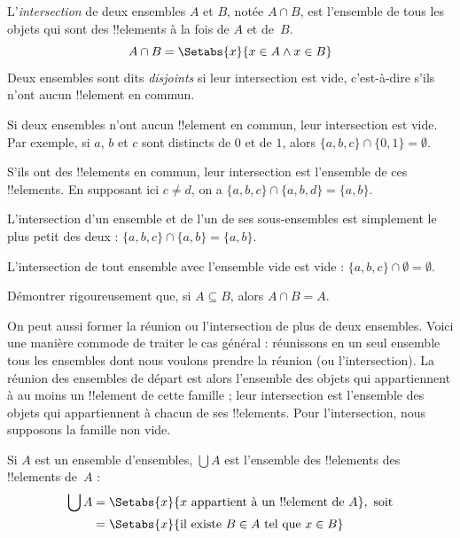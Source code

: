 \documentclass[../../../include/open-logic-section]{subfiles}
\begin{document}
\begin{defn}[Intersection]
L'\emph{intersection} de deux ensembles $A$ et $B$, notée
$A \cap B$, est l'ensemble de tous les objets qui sont
des !!{element}s à la fois de $A$ et de~$B$.
\[
A \cap B = \Setabs{x}{x \in A \land x \in B}
\]
Deux ensembles sont dits \emph{disjoints} si leur intersection
est vide, c'est-à-dire s'ils n'ont aucun !!{element} en commun.
\end{defn}

\begin{ex}
Si deux ensembles n'ont aucun !!{element} en commun, leur
intersection est vide. Par exemple, si $a$, $b$ et $c$ sont
distincts de $0$ et de $1$, alors
%
$\{ a, b, c\} \cap \{ 0, 1\} = \emptyset$.

S'ils ont des !!{element}s en commun, leur intersection est
l'ensemble de ces !!{element}s. En supposant ici $c\neq d$,
on a $\{a, b, c \} \cap \{a, b, d \} = \{a, b\}$.
%
%

L'intersection d'un ensemble et de l'un de ses sous-ensembles
est simplement le plus petit des deux :
$\{a, b, c\} \cap \{a, b\} = \{a, b\}$.

L'intersection de tout ensemble avec l'ensemble vide est vide :
$\{a, b, c \} \cap \emptyset = \emptyset$.
\end{ex}

\begin{prob}
Démontrer rigoureusement que, si $A \subseteq B$, alors
$A \cap B = A$.
\end{prob}

\begin{explain}
On peut aussi former la réunion ou l'intersection de plus de
deux ensembles. Voici une manière commode de traiter le cas général :
réunissons en un seul ensemble tous les ensembles dont nous voulons
prendre la réunion (ou l'intersection). La réunion des ensembles
de départ est alors l'ensemble des objets qui appartiennent à
au moins un !!{element} de cette famille ; leur intersection
est l'ensemble des objets qui appartiennent à chacun de ses
!!{element}s. Pour l'intersection, nous supposons la famille non vide.
\end{explain}

\begin{defn}
Si $A$ est un ensemble d'ensembles, $\bigcup A$ est l'ensemble
des !!{element}s des !!{element}s de~$A$ :
\begin{align*}
\bigcup A & = \Setabs{x}{x \text{ appartient à un !!{element} de } A},
\text{ soit}\\
& = \Setabs{x}{\text{il existe } B \in A
  \text{ tel que } x \in B}
\end{align*}
\end{defn}
\end{document}
